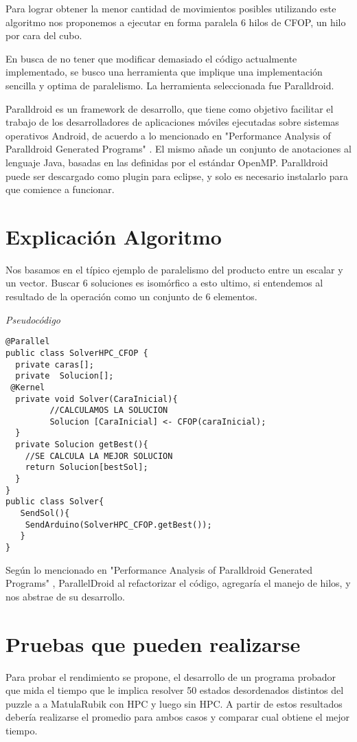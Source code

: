 \documentclass[runningheads,a4paper]{llncs}
\begin{document}
Para lograr obtener la menor cantidad de movimientos posibles utilizando este algoritmo nos proponemos a ejecutar en forma paralela 6 hilos de CFOP, un hilo por cara del cubo.

En busca de no tener que modificar demasiado el código actualmente implementado, se busco una herramienta que implique una implementación sencilla y optima de paralelismo. La herramienta seleccionada fue Paralldroid.

Paralldroid es un framework de desarrollo, que tiene como objetivo facilitar el trabajo de los desarrolladores de aplicaciones móviles ejecutadas sobre sistemas operativos Android, de acuerdo a lo mencionado en "Performance Analysis of Paralldroid Generated Programs" \cite{jour}. El mismo añade un conjunto de anotaciones al lenguaje Java, basadas en las definidas por el estándar OpenMP. Paralldroid puede ser descargado como plugin para eclipse, y solo es necesario instalarlo para que comience a funcionar\cite{jour}.


\section{Explicación Algoritmo}

Nos basamos en el típico ejemplo de paralelismo del producto entre un escalar y un vector. Buscar 6 soluciones es isomórfico a esto 
ultimo, si entendemos al resultado de la operación como un conjunto de 6 elementos. 

\medskip
\noindent
{\it Pseudocódigo}
\begin{verbatim}
@Parallel
public class SolverHPC_CFOP {
  private caras[];
  private  Solucion[];
 @Kernel
  private void Solver(CaraInicial){
         //CALCULAMOS LA SOLUCION
         Solucion [CaraInicial] <- CFOP(caraInicial);
  }
  private Solucion getBest(){
 	//SE CALCULA LA MEJOR SOLUCION
 	return Solucion[bestSol];
  }
}
public class Solver{
   SendSol(){
   	SendArduino(SolverHPC_CFOP.getBest());
   }
}
\end{verbatim}
%
\noindent


Según lo mencionado en "Performance Analysis of Paralldroid Generated Programs" \cite{jour}, ParallelDroid al refactorizar el código, agregaría el manejo de hilos, y nos abstrae de su desarrollo.


\section{Pruebas que pueden realizarse}
Para probar el rendimiento se propone, el desarrollo de un programa probador que mida el tiempo que le implica resolver 50 estados desordenados distintos del  puzzle a a MatulaRubik con HPC y luego sin HPC. A partir de estos resultados debería realizarse el promedio para ambos casos y comparar cual obtiene el mejor tiempo.
\end{document}
